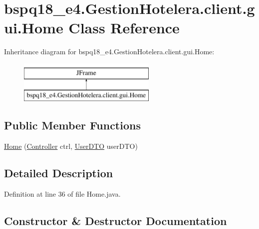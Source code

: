 \hypertarget{classbspq18__e4_1_1_gestion_hotelera_1_1client_1_1gui_1_1_home}{}\section{bspq18\+\_\+e4.\+Gestion\+Hotelera.\+client.\+gui.\+Home Class Reference}
\label{classbspq18__e4_1_1_gestion_hotelera_1_1client_1_1gui_1_1_home}
Inheritance diagram for bspq18\+\_\+e4.\+Gestion\+Hotelera.\+client.\+gui.\+Home\+:\begin{figure}[H]
\begin{center}
\leavevmode
\includegraphics[height=2.000000cm]{classbspq18__e4_1_1_gestion_hotelera_1_1client_1_1gui_1_1_home}
\end{center}
\end{figure}
\subsection*{Public Member Functions}
\begin{DoxyCompactItemize}
\item 
\mbox{\hyperlink{classbspq18__e4_1_1_gestion_hotelera_1_1client_1_1gui_1_1_home_ac6e4921612ee77aa2e9999f4d7ba0fcc}{Home}} (\mbox{\hyperlink{classbspq18__e4_1_1_gestion_hotelera_1_1client_1_1controller_1_1_controller}{Controller}} ctrl, \mbox{\hyperlink{classbspq18__e4_1_1_gestion_hotelera_1_1server_1_1dto_1_1_user_d_t_o}{User\+D\+TO}} user\+D\+TO)
\end{DoxyCompactItemize}


\subsection{Detailed Description}


Definition at line 36 of file Home.\+java.



\subsection{Constructor \& Destructor Documentation}
\mbox{\label{classbspq18__e4_1_1_gestion_hotelera_1_1client_1_1gui_1_1_home_ac6e4921612ee77aa2e9999f4d7ba0fcc}} 
